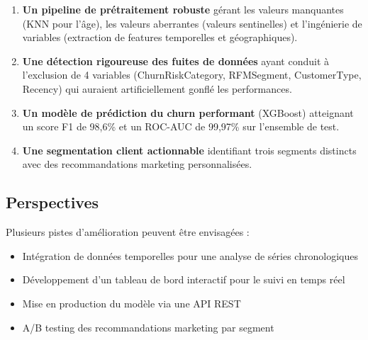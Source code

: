 \documentclass[12pt,a4paper]{article}
\begin{document}
\begin{enumerate}
    \item \textbf{Un pipeline de prétraitement robuste} gérant les valeurs manquantes (KNN pour l'âge), les valeurs aberrantes (valeurs sentinelles) et l'ingénierie de variables (extraction de features temporelles et géographiques).

    \item \textbf{Une détection rigoureuse des fuites de données} ayant conduit à l'exclusion de 4 variables (ChurnRiskCategory, RFMSegment, CustomerType, Recency) qui auraient artificiellement gonflé les performances.

    \item \textbf{Un modèle de prédiction du churn performant} (XGBoost) atteignant un score F1 de 98,6\% et un ROC-AUC de 99,97\% sur l'ensemble de test.

    \item \textbf{Une segmentation client actionnable} identifiant trois segments distincts avec des recommandations marketing personnalisées.
\end{enumerate}

\subsection{Perspectives}

Plusieurs pistes d'amélioration peuvent être envisagées :
\begin{itemize}
    \item Intégration de données temporelles pour une analyse de séries chronologiques
    \item Développement d'un tableau de bord interactif pour le suivi en temps réel
    \item Mise en production du modèle via une API REST
    \item A/B testing des recommandations marketing par segment
\end{itemize}
\end{document}

